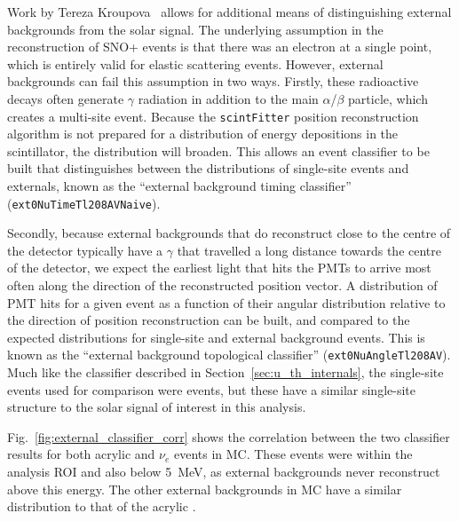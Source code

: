 Work by Tereza Kroupova~\cite{kroupovaImprovingSensitivityNeutrinoless2020} %
allows for additional means of distinguishing external backgrounds from the solar signal. The underlying assumption in the reconstruction of SNO+ events is that there was an electron at a single point, which is entirely valid for \beight{} elastic scattering events. However, external backgrounds can fail this assumption in two ways. Firstly, these radioactive decays often generate $\gamma$ radiation in addition to the main $\alpha$/$\beta$ particle, which creates a multi-site event. Because the \texttt{scintFitter} position reconstruction algorithm is not prepared for a distribution of energy depositions in the scintillator, the \tres{} distribution will broaden. This allows an event classifier to be built that distinguishes between the \tres{} distributions of single-site events and externals, known as the ``external background timing classifier'' (\texttt{ext0NuTimeTl208AVNaive}).

Secondly, because external backgrounds that do reconstruct close to the centre of the detector typically have a $\gamma$ that travelled a long distance towards the centre of the detector, we expect the earliest light that hits the PMTs to arrive most often along the direction of the reconstructed position vector. A distribution of PMT hits for a given event as a function of their angular distribution relative to the direction of position reconstruction can be built, and compared to the expected distributions for single-site and external background events. This is known as the ``external background topological classifier'' (\texttt{ext0NuAngleTl208AV}). Much like the classifier described in Section~\ref{sec:u_th_internals}, the single-site events used for comparison were \onbb{} events, but these have a similar single-site structure to the solar signal of interest in this analysis.

Fig.~\ref{fig:external_classifier_corr} shows the correlation between the two classifier results for both acrylic  and \beight{} $\nu_{e}$ events in MC. These events were within the analysis ROI and also below \SI{5}{\MeV}, as external backgrounds never reconstruct above this energy. The other external backgrounds in MC have a similar distribution to that of the acrylic .

